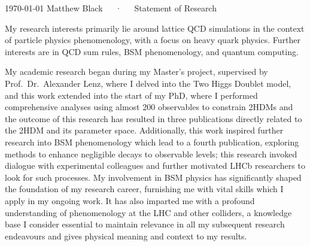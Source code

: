 \documentclass[11pt, a4paper]{awesome-cv}
\begin{document}
\makecvheader[R]

\makecvfooter
  {\today}
  {Matthew Black~~~·~~~Statement of Research}
  {}


\begin{cvletter}

My research interests primarily lie around lattice QCD simulations in the context of particle physics phenomenology, with a focus on heavy quark physics.
Further interests are in QCD sum rules, BSM phenomenology, and quantum computing.

My academic research began during my Master's project, supervised by Prof.~Dr.~Alexander Lenz, where I delved into the Two Higgs Doublet model, and this work extended into the start of my PhD, where I performed comprehensive analyses using almost 200 observables to constrain 2HDMs and the outcome of this research has resulted in three publications directly related to the 2HDM and its parameter space. 
Additionally, this work inspired further research into BSM phenomenology which lead to a fourth publication, exploring methods to enhance negligible decays to observable levels; this research invoked dialogue with experimental colleagues and further motivated LHCb researchers to look for such processes.
My involvement in BSM physics has significantly shaped the foundation of my research career, furnishing me with vital skills which I apply in my ongoing work. 
It has also imparted me with a profound understanding of phenomenology at the LHC and other colliders, a knowledge base I consider essential to maintain relevance in all my subsequent research endeavours and gives physical meaning and context to my results.


\end{cvletter}
\end{document}
